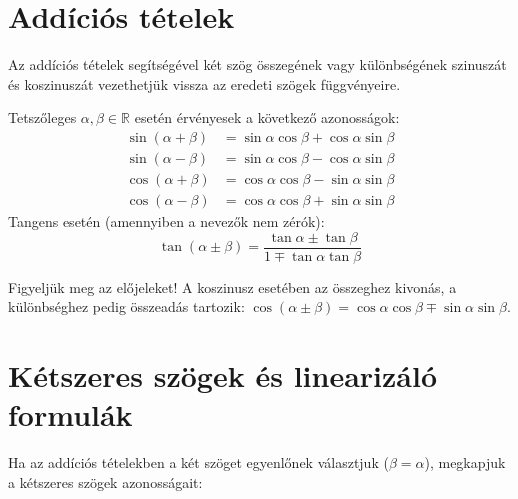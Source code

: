 \documentclass[11pt,a4paper]{article}
\begin{document}
\newpage

\section{Addíciós tételek}

Az addíciós tételek segítségével két szög összegének vagy különbségének szinuszát és koszinuszát vezethetjük vissza az eredeti szögek függvényeire.

\begin{kiemelt}
Tetszőleges $\alpha, \beta \in \mathbb{R}$ esetén érvényesek a következő azonosságok:
\begin{align}
    \sin(\alpha + \beta) &= \sin\alpha\cos\beta + \cos\alpha\sin\beta \\
    \sin(\alpha - \beta) &= \sin\alpha\cos\beta - \cos\alpha\sin\beta \\
    \cos(\alpha + \beta) &= \cos\alpha\cos\beta - \sin\alpha\sin\beta \\
    \cos(\alpha - \beta) &= \cos\alpha\cos\beta + \sin\alpha\sin\beta
\end{align}
Tangens esetén (amennyiben a nevezők nem zérók):
\[
\tan(\alpha \pm \beta) = \frac{\tan\alpha \pm \tan\beta}{1 \mp \tan\alpha\tan\beta}
\]
\end{kiemelt}

\begin{megjegyzes}
Figyeljük meg az előjeleket! A koszinusz esetében az összeghez kivonás, a különbséghez pedig összeadás tartozik: $\cos(\alpha \pm \beta) = \cos\alpha\cos\beta \mp \sin\alpha\sin\beta$.
\end{megjegyzes}

\section{Kétszeres szögek és linearizáló formulák}

Ha az addíciós tételekben a két szöget egyenlőnek választjuk ($\beta = \alpha$), megkapjuk a kétszeres szögek azonosságait:
\end{document}

